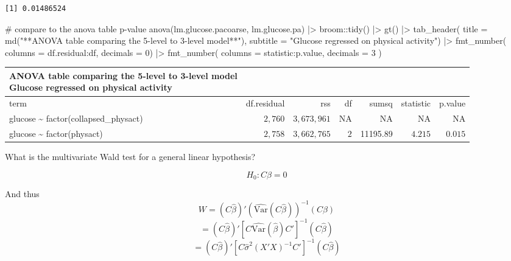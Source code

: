 \documentclass[
  letterpaper,
  DIV=11,
  numbers=noendperiod]{scrreport}
\newenvironment{Shaded}{\begin{snugshade}}{\end{snugshade}}
\newcommand{\AttributeTok}[1]{\textcolor[rgb]{0.40,0.45,0.13}{#1}}
\newcommand{\CommentTok}[1]{\textcolor[rgb]{0.37,0.37,0.37}{#1}}
\newcommand{\DecValTok}[1]{\textcolor[rgb]{0.68,0.00,0.00}{#1}}
\newcommand{\FunctionTok}[1]{\textcolor[rgb]{0.28,0.35,0.67}{#1}}
\newcommand{\NormalTok}[1]{\textcolor[rgb]{0.00,0.23,0.31}{#1}}
\newcommand{\SpecialCharTok}[1]{\textcolor[rgb]{0.37,0.37,0.37}{#1}}
\newcommand{\StringTok}[1]{\textcolor[rgb]{0.13,0.47,0.30}{#1}}
\begin{document}
\begin{verbatim}
[1] 0.01486524
\end{verbatim}

\begin{Shaded}
\begin{Highlighting}[]
\CommentTok{\# compare to the anova table p{-}value}
\FunctionTok{anova}\NormalTok{(lm.glucose.pacoarse, lm.glucose.pa) }\SpecialCharTok{|\textgreater{}} 
\NormalTok{  broom}\SpecialCharTok{::}\FunctionTok{tidy}\NormalTok{() }\SpecialCharTok{|\textgreater{}} 
  \FunctionTok{gt}\NormalTok{() }\SpecialCharTok{|\textgreater{}} 
  \FunctionTok{tab\_header}\NormalTok{(}
    \AttributeTok{title =} \FunctionTok{md}\NormalTok{(}\StringTok{"**ANOVA table comparing the 5{-}level to 3{-}level model**"}\NormalTok{),}
    \AttributeTok{subtitle =} \StringTok{"Glucose regressed on physical activity"}\NormalTok{) }\SpecialCharTok{|\textgreater{}} 
  \FunctionTok{fmt\_number}\NormalTok{(}
    \AttributeTok{columns =}\NormalTok{ df.residual}\SpecialCharTok{:}\NormalTok{df,}
    \AttributeTok{decimals =} \DecValTok{0}\NormalTok{) }\SpecialCharTok{|\textgreater{}} 
  \FunctionTok{fmt\_number}\NormalTok{(}
    \AttributeTok{columns =}\NormalTok{ statistic}\SpecialCharTok{:}\StringTok{\textasciigrave{}}\AttributeTok{p.value}\StringTok{\textasciigrave{}}\NormalTok{,}
    \AttributeTok{decimals =} \DecValTok{3}
\NormalTok{    )}
\end{Highlighting}
\end{Shaded}

\begin{longtable}{lrrrrrr}
\caption*{
{\large \textbf{ANOVA table comparing the 5-level to 3-level model}} \\ 
{\small Glucose regressed on physical activity}
} \\ 
\toprule
term & df.residual & rss & df & sumsq & statistic & p.value \\ 
\midrule
glucose \textasciitilde{} factor(collapsed\_physact) & $2,760$ & $3,673,961$ & NA & NA & NA & NA \\ 
glucose \textasciitilde{} factor(physact) & $2,758$ & $3,662,765$ & $2$ & 11195.89 & $4.215$ & $0.015$ \\ 
\bottomrule
\end{longtable}

What is the multivariate Wald test for a general linear hypothesis?

\[H_0 : C\beta = 0\]

And thus
\[W = (C\hat \beta)'(\widehat{\text{Var}}(C\hat\beta))^{-1}(C\beta)\]
\[ = (C\hat\beta)'[C \widehat{\text{Var}}(\hat\beta) C']^{-1}(C\hat\beta)\]
\[ = (C\hat\beta)'[C \hat \sigma^2 (X'X)^{-1} C']^{-1} (C\hat\beta)\]
\end{document}
